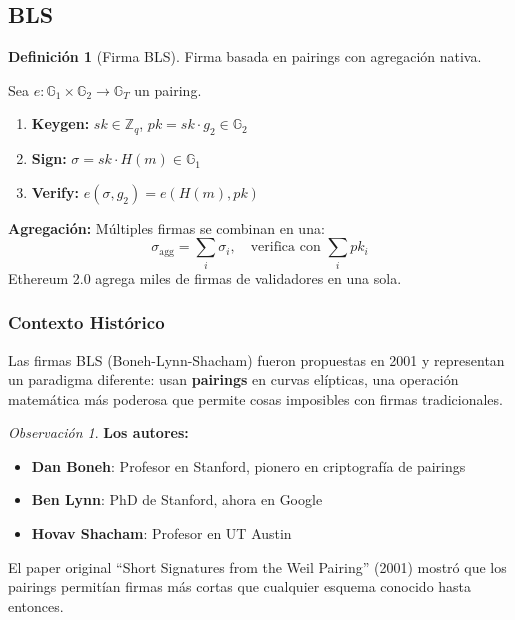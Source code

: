\documentclass[11pt,a4paper,twoside,openright]{book}
\theoremstyle{definition}
\newtheorem{definition}{Definición}[chapter]
\theoremstyle{plain}
\theoremstyle{remark}
\newtheorem{remark}{Observación}[chapter]
\newcommand{\Z}{\mathbb{Z}}
\newcommand{\G}{\mathbb{G}}
\begin{document}

\subsection{BLS}

\begin{definition}[Firma BLS]
Firma basada en pairings con agregación nativa.
\end{definition}

Sea $e: \G_1 \times \G_2 \to \G_T$ un pairing.
\begin{enumerate}
    \item \textbf{Keygen:} $sk \in \Z_q$, $pk = sk \cdot g_2 \in \G_2$
    \item \textbf{Sign:} $\sigma = sk \cdot H(m) \in \G_1$
    \item \textbf{Verify:} $e(\sigma, g_2) = e(H(m), pk)$
\end{enumerate}

\begin{keyidea}
\textbf{Agregación:} Múltiples firmas se combinan en una:
\[
\sigma_{\text{agg}} = \sum_i \sigma_i, \quad \text{verifica con } \sum_i pk_i
\]
Ethereum 2.0 agrega miles de firmas de validadores en una sola.
\end{keyidea}

\subsubsection{Contexto Histórico}

\begin{intuicion}
Las firmas BLS (Boneh-Lynn-Shacham) fueron propuestas en 2001 y representan un paradigma diferente: usan \textbf{pairings} en curvas elípticas, una operación matemática más poderosa que permite cosas imposibles con firmas tradicionales.
\end{intuicion}

\begin{remark}
\textbf{Los autores:}
\begin{itemize}
    \item \textbf{Dan Boneh}: Profesor en Stanford, pionero en criptografía de pairings
    \item \textbf{Ben Lynn}: PhD de Stanford, ahora en Google
    \item \textbf{Hovav Shacham}: Profesor en UT Austin
\end{itemize}

El paper original ``Short Signatures from the Weil Pairing'' (2001) mostró que los pairings permitían firmas más cortas que cualquier esquema conocido hasta entonces.
\end{remark}
\end{document}
